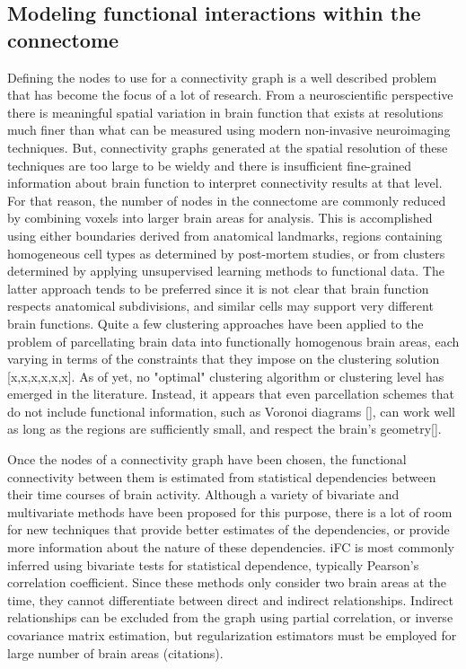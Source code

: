 \subsection{Modeling functional interactions within the connectome}

Defining the nodes to use for a connectivity graph is a well described problem that has become the focus of a lot of research. From a neuroscientific perspective there is meaningful spatial variation in brain function that exists at resolutions much finer than what can be measured using modern non-invasive neuroimaging techniques. But, connectivity graphs generated at the spatial resolution of these techniques are too large to be wieldy and there is insufficient fine-grained information about brain function to interpret connectivity results at that level. For that reason, the number of nodes in the connectome are commonly reduced by combining voxels into larger brain areas for analysis. This is accomplished using either boundaries derived from anatomical landmarks, regions containing homogeneous cell types as determined by post-mortem studies, or from clusters determined by applying unsupervised learning methods to functional data. The latter approach tends to be preferred since it is not clear that brain function respects anatomical subdivisions, and similar cells may support very different brain functions. Quite a few clustering approaches have been applied to the problem of parcellating brain data into functionally homogenous brain areas, each varying in terms of the constraints that they impose on the clustering solution [x,x,x,x,x,x]. As of yet, no "optimal" clustering algorithm or clustering level has emerged in the literature. Instead, it appears that even parcellation schemes that do not include functional information, such as Voronoi diagrams [], can work well as long as the regions are sufficiently small, and respect the brain's geometry[].

Once the nodes of a connectivity graph have been chosen, the functional connectivity between them is estimated from statistical dependencies between their time courses of brain activity. Although a variety of bivariate and multivariate methods have been proposed for this purpose\cite{SmithNeuor2010,Varoquaux}, there is a lot of room for new techniques that provide better estimates of the dependencies, or provide more information about the nature of these dependencies. iFC is most commonly inferred using bivariate tests for statistical dependence, typically Pearson's correlation coefficient. Since these methods only consider two brain areas at the time, they cannot differentiate between direct and indirect relationships. Indirect relationships can be excluded from the graph using partial correlation, or inverse covariance matrix estimation, but regularization estimators must be employed for large number of brain areas (citations). 


